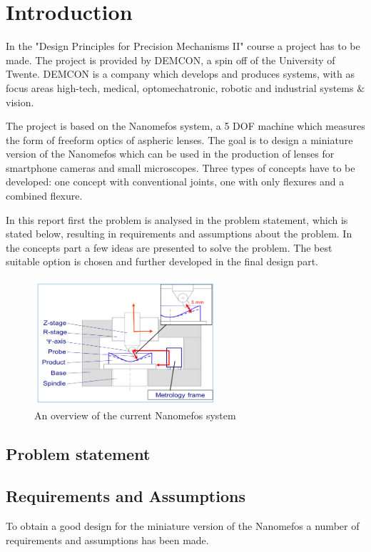 \section{Introduction}

In the "Design Principles for Precision Mechanisms II" course a project has to be made. The project is provided by DEMCON, a spin off of the University of Twente. DEMCON is a company which develops and produces systems, with as focus areas high-tech, medical, optomechatronic, robotic and industrial systems $\&$ vision.

The project is based on the Nanomefos system, a 5 DOF machine which measures the form of freeform optics  of aspheric lenses. The goal is to design a miniature version of the Nanomefos which can be used in the production of lenses for smartphone cameras and small microscopes. Three types of concepts have to be developed: one concept with conventional joints, one with only flexures and a combined flexure. 

In this report first the problem is analysed in the problem statement, which is stated below, resulting in
requirements and assumptions about the problem. In the concepts part a few ideas are presented to solve
the problem. The best suitable option is chosen and further developed in the final design part.

\begin{figure}[h]
    \centering
    \includegraphics[width=0.6\textwidth]{images/Nanomefos.png}
    \caption{An overview of the current Nanomefos system}
    \label{fig:Nanomefos}
\end{figure}

\subsection{Problem statement}


\subsection{Requirements and Assumptions} \label{sec:requirements}
\label{requirementandassumptions}
To obtain a good design for the miniature version of the Nanomefos a number of requirements and assumptions has been made. 

